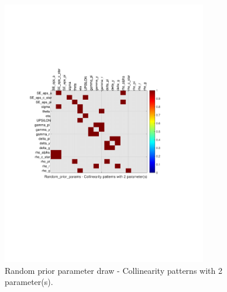 
\begin{figure}[H]
\centering 
\includegraphics[width=0.8\textwidth]{fiscal/identification/fiscal_ident_collinearity_Random_prior_params_2}
\caption{Random prior parameter draw  - Collinearity patterns with 2 parameter(s).}\label{Fig:collinearity:Random_prior_params:2_pars}
\end{figure}

